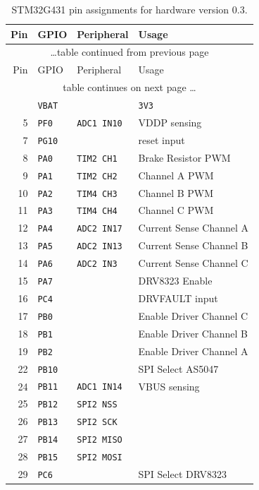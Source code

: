 \documentclass[12pt,a4paper,oneside,openany]{article}
\begin{document}
\begin{longtable}[htbp]{@{}rlll@{}}%
\caption{STM32G431 pin assignments for hardware version 0.3. \label{tab:mcu-pins}} \\
\toprule 
        Pin & GPIO         & Peripheral        & Usage \\
\midrule 
\endfirsthead
\multicolumn{4}{c}{\ldots table continued from previous page} \\
\midrule
         Pin & GPIO         & Peripheral        & Usage \\
\midrule
\endhead
\multicolumn{4}{c}{table continues on next page \ldots} \\
\endfoot
\bottomrule
\endlastfoot
          1 & \texttt{VBAT} &                   & \texttt{3V3}  \\
\midrule  5 & \texttt{PF0}  &\texttt{ADC1 IN10} & VDDP sensing \\
\midrule  7 & \texttt{PG10} &                   & reset input \\
\midrule  8 & \texttt{PA0}  &\texttt{TIM2 CH1}  & Brake Resistor PWM \\
          9 & \texttt{PA1}  &\texttt{TIM2 CH2}  & Channel A PWM \\
         10 & \texttt{PA2}  &\texttt{TIM4 CH3}  & Channel B PWM \\
         11 & \texttt{PA3}  &\texttt{TIM4 CH4}  & Channel C PWM \\
\midrule 12 & \texttt{PA4}  &\texttt{ADC2 IN17} & Current Sense Channel A \\
         13 & \texttt{PA5}  &\texttt{ADC2 IN13} & Current Sense Channel B \\
         14 & \texttt{PA6}  &\texttt{ADC2 IN3}  & Current Sense Channel C \\
\midrule 15 & \texttt{PA7}  &                   & DRV8323 Enable \\
\midrule 16 & \texttt{PC4}  &                   & DRVFAULT input \\
\midrule 17 & \texttt{PB0}  &                   & Enable Driver Channel C \\
         18 & \texttt{PB1}  &                   & Enable Driver Channel B \\
         19 & \texttt{PB2}  &                   & Enable Driver Channel A \\
\midrule 22 & \texttt{PB10} &                   & SPI Select AS5047 \\
\midrule 24 & \texttt{PB11} &\texttt{ADC1 IN14} & VBUS sensing \\
\midrule 25 & \texttt{PB12} &\texttt{SPI2 NSS}  &  \\
         26 & \texttt{PB13} &\texttt{SPI2 SCK}  &  \\
         27 & \texttt{PB14} &\texttt{SPI2 MISO} &  \\
         28 & \texttt{PB15} &\texttt{SPI2 MOSI} &  \\
\midrule 29 & \texttt{PC6}  &                   & SPI Select DRV8323 \\


\end{longtable}
\end{document}
